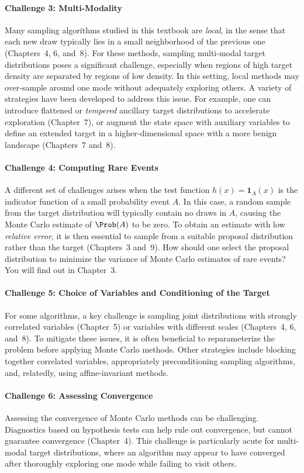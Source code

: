 \paragraph{Challenge 3: Multi-Modality}
Many sampling algorithms studied in this textbook are \textit{local}, in the sense that each new
draw typically lies in a small neighborhood of the previous one (Chapters~4, 6, and~8). For these
methods, sampling multi-modal target distributions poses a significant challenge, especially when
regions of high target density are separated by regions of low density. In this setting, local
methods may over-sample around one mode without adequately exploring others. A variety of strategies
have been developed to address this issue. For example, one can introduce flattened or \textit{tempered}
ancillary target distributions to accelerate exploration (Chapter~7), or augment the state space
with auxiliary variables to define an extended target in a higher-dimensional space with a more
benign landscape (Chapters~7 and~8).

\paragraph{Challenge 4: Computing Rare Events}
A different set of challenges arises when the test function $h(x) = \mathbf{1}_A(x)$ is the
indicator function of a small probability event $A$. In this case, a random sample from the target
distribution will typically contain no draws in $A$, causing the Monte Carlo estimate of $\Prob(A)$
to be zero. To obtain an estimate with low \textit{relative error}, it is then essential to sample
from a suitable proposal distribution rather than the target (Chapters~3 and~9). How should one
select the proposal distribution to minimize the variance of Monte Carlo estimates of rare events?
You will find out in Chapter~3.

\paragraph{Challenge 5: Choice of Variables and Conditioning of the Target}
For some algorithms, a key challenge is sampling joint distributions with strongly correlated
variables (Chapter~5) or variables with different scales (Chapters~4, 6, and~8). To mitigate
these issues, it is often beneficial to reparameterize the problem before applying Monte Carlo
methods. Other strategies include blocking together correlated variables, appropriately
preconditioning sampling algorithms, and, relatedly, using affine-invariant methods.

\paragraph{Challenge 6: Assessing Convergence}
Assessing the convergence of Monte Carlo methods can be challenging. Diagnostics based on
hypothesis tests can help rule out convergence, but cannot guarantee convergence (Chapter~4).
This challenge is particularly acute for multi-modal target distributions, where an algorithm
may appear to have converged after thoroughly exploring one mode while failing to visit others.
